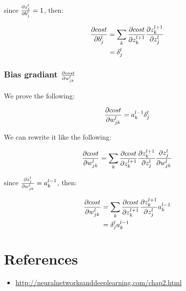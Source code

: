 \documentclass[a4paper]{article}
\begin{document}
since $\frac{\partial z_{j}^{l}}{\partial b_{j}^{l}} = 1$, then:

\begin{align}
  \frac{\partial cost}{\partial b_{j}^{l}} &=
    \sum_{k}{
      \frac{\partial cost}{\partial z_{k}^{l+1}}
      \frac{\partial z_{k}^{l+1}}{\partial z_{j}^{l}}
    } \\
    &= \delta_{j}^{l}
\end{align}

\subsubsection{Bias gradiant $\frac{\partial cost}{\partial w_{jk}^{l}}$}

We prove the following:

\begin{align}
  \frac{\partial cost}{\partial w_{jk}^{l}} = a_{k}^{l-1} \delta_{j}^{l}
\end{align}

We can rewrite it like the following:

\begin{align}
  \frac{\partial cost}{\partial w_{jk}^{l}} =
    \sum_{k}{
      \frac{\partial cost}{\partial z_{k}^{l+1}}
      \frac{\partial z_{k}^{l+1}}{\partial z_{j}^{l}}
      \frac{\partial z_{j}^{l}}{\partial w_{jk}^{l}}
    }
\end{align}

since $\frac{\partial z_{j}^{l}}{\partial w_{jk}^{l}} = a_{k}^{l-1}$, then:

\begin{align}
  \frac{\partial cost}{\partial w_{jk}^{l}} &=
    \sum_{k}{
      \frac{\partial cost}{\partial z_{k}^{l+1}}
      \frac{\partial z_{k}^{l+1}}{\partial z_{j}^{l}}
      a_{k}^{l-1}
    } \\
    &= \delta_{j}^{l} a_{k}^{l-1}
\end{align}

\section{References}

\begin{itemize}
  \item \url{http://neuralnetworksanddeeplearning.com/chap2.html}
\end{itemize}
\end{document}
